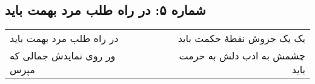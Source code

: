 \begin{center}
\section*{شماره ۵: در راه طلب مرد بهمت باید}
\label{sec:005}
\begin{longtable}{l p{0.5cm} r}
در راه طلب مرد بهمت باید
&&
یک یک جزوش نقطهٔ حکمت باید
\\
ور روی نمایدش جمالی که مپرس
&&
چشمش به ادب دلش به حرمت باید
\\
\end{longtable}
\end{center}
